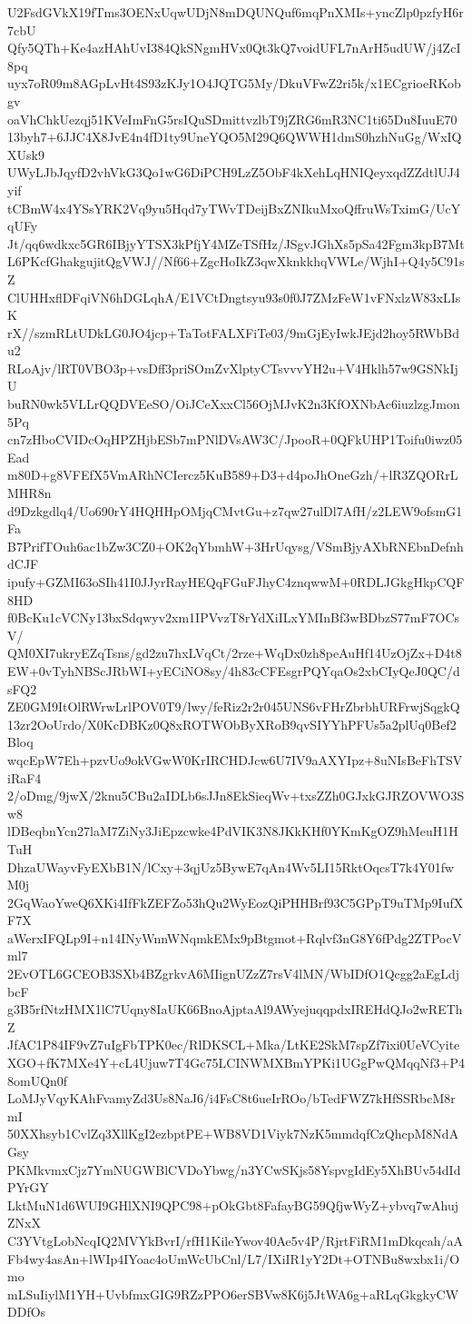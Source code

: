 U2FsdGVkX19fTms3OENxUqwUDjN8mDQUNQuf6mqPnXMIs+yncZlp0pzfyH6r7cbU
Qfy5QTh+Ke4azHAhUvI384QkSNgmHVx0Qt3kQ7voidUFL7nArH5udUW/j4ZcI8pq
uyx7oR09m8AGpLvHt4S93zKJy1O4JQTG5My/DkuVFwZ2ri5k/x1ECgrioeRKobgv
oaVhChkUezqj51KVeImFnG5rsIQuSDmittvzlbT9jZRG6mR3NC1ti65Du8IuuE70
13byh7+6JJC4X8JvE4n4fD1ty9UneYQO5M29Q6QWWH1dmS0hzhNuGg/WxIQXUsk9
UWyLJbJqyfD2vhVkG3Qo1wG6DiPCH9LzZ5ObF4kXehLqHNIQeyxqdZZdtlUJ4yif
tCBmW4x4YSsYRK2Vq9yu5Hqd7yTWvTDeijBxZNIkuMxoQffruWsTximG/UcYqUFy
Jt/qq6wdkxc5GR6IBjyYTSX3kPfjY4MZeTSfHz/JSgvJGhXs5pSa42Fgm3kpB7Mt
L6PKcfGhakgujitQgVWJ//Nf66+ZgcHoIkZ3qwXknkkhqVWLe/WjhI+Q4y5C91sZ
ClUHHxflDFqiVN6hDGLqhA/E1VCtDngtsyu93s0f0J7ZMzFeW1vFNxlzW83xLIsK
rX//szmRLtUDkLG0JO4jcp+TaTotFALXFiTe03/9mGjEyIwkJEjd2hoy5RWbBdu2
RLoAjv/lRT0VBO3p+vsDff3priSOmZvXlptyCTsvvvYH2u+V4Hklh57w9GSNkIjU
buRN0wk5VLLrQQDVEeSO/OiJCeXxxCl56OjMJvK2n3KfOXNbAc6iuzlzgJmon5Pq
cn7zHboCVIDcOqHPZHjbESb7mPNlDVsAW3C/JpooR+0QFkUHP1Toifu0iwz05Ead
m80D+g8VFEfX5VmARhNCIercz5KuB589+D3+d4poJhOneGzh/+lR3ZQORrLMHR8n
d9Dzkgdlq4/Uo690rY4HQHHpOMjqCMvtGu+z7qw27ulDl7AfH/z2LEW9ofsmG1Fa
B7PrifTOuh6ac1bZw3CZ0+OK2qYbmhW+3HrUqysg/VSmBjyAXbRNEbnDefnhdCJF
ipufy+GZMI63oSIh41I0JJyrRayHEQqFGuFJhyC4znqwwM+0RDLJGkgHkpCQF8HD
f0BcKu1cVCNy13bxSdqwyv2xm1IPVvzT8rYdXiILxYMInBf3wBDbzS77mF7OCsV/
QM0XI7ukryEZqTsns/gd2zu7hxLVqCt/2rze+WqDx0zh8peAuHf14UzOjZx+D4t8
EW+0vTyhNBScJRbWI+yECiNO8sy/4h83cCFEsgrPQYqaOs2xbCIyQeJ0QC/dsFQ2
ZE0GM9ItOlRWrwLrlPOV0T9/lwy/feRiz2r2r045UNS6vFHrZbrbhURFrwjSqgkQ
13zr2OoUrdo/X0KcDBKz0Q8xROTWObByXRoB9qvSIYYhPFUs5a2plUq0Bef2Bloq
wqcEpW7Eh+pzvUo9okVGwW0KrIRCHDJcw6U7IV9aAXYIpz+8uNIsBeFhTSViRaF4
2/oDmg/9jwX/2knu5CBu2aIDLb6sJJn8EkSieqWv+txsZZh0GJxkGJRZOVWO3Sw8
lDBeqbnYcn27laM7ZiNy3JiEpzcwke4PdVIK3N8JKkKHf0YKmKgOZ9hMeuH1HTuH
DhzaUWayvFyEXbB1N/lCxy+3qjUz5BywE7qAn4Wv5LI15RktOqcsT7k4Y01fwM0j
2GqWaoYweQ6XKi4IfFkZEFZo53hQu2WyEozQiPHHBrf93C5GPpT9uTMp9IufXF7X
aWerxIFQLp9I+n14INyWnnWNqmkEMx9pBtgmot+Rqlvf3nG8Y6fPdg2ZTPocVml7
2EvOTL6GCEOB3SXb4BZgrkvA6MIignUZzZ7rsV4lMN/WbIDfO1Qcgg2aEgLdjbcF
g3B5rfNtzHMX1lC7Uqny8IaUK66BnoAjptaAl9AWyejuqqpdxIREHdQJo2wREThZ
JfAC1P84IF9vZ7uIgFbTPK0ec/RlDKSCL+Mka/LtKE2SkM7spZf7ixi0UeVCyite
XGO+fK7MXe4Y+cL4Ujuw7T4Gc75LCINWMXBmYPKi1UGgPwQMqqNf3+P48omUQn0f
LoMJyVqyKAhFvamyZd3Us8NaJ6/i4FsC8t6ueIrROo/bTedFWZ7kHfSSRbcM8rmI
50XXhsyb1CvlZq3XllKgI2ezbptPE+WB8VD1Viyk7NzK5mmdqfCzQhcpM8NdAGsy
PKMkvmxCjz7YmNUGWBlCVDoYbwg/n3YCwSKjs58YspvgIdEy5XhBUv54dIdPYrGY
LktMuN1d6WUI9GHlXNI9QPC98+pOkGbt8FafayBG59QfjwWyZ+ybvq7wAhujZNxX
C3YVtgLobNcqIQ2MVYkBvrI/rfH1KileYwov40Ae5v4P/RjrtFiRM1mDkqcah/aA
Fb4wy4asAn+lWIp4IYoac4oUmWcUbCnl/L7/IXiIR1yY2Dt+OTNBu8wxbx1i/Omo
mLSuIiylM1YH+UvbfmxGIG9RZzPPO6erSBVw8K6j5JtWA6g+aRLqGkgkyCWDDfOs
